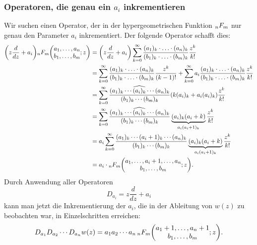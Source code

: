\subsubsection{Operatoren, die genau ein $a_i$ inkrementieren}
Wir suchen einen Operator, der in der hypergeometrischen Funktion
$\mathstrut_nF_m$ nur genau den Parameter $a_i$ inkrementiert.
Der folgende Operator schafft dies:
\begin{align*}
\biggl(z\frac{d}{dz}+a_i\biggr)
\mathstrut_nF_m\biggl(\begin{matrix}a_1,\dots,a_n\\b_1,\dots,b_m\end{matrix};
z\biggr)
&=
\biggl(z\frac{d}{dz}+a_i\biggr)
\sum_{k=0}^\infty
\frac{(a_1)_k\cdot\ldots\cdot(a_n)_k}{(b_1)_k\cdot\ldots\cdot(b_m)_k}
\frac{z^k}{k!}
\\
&=
\sum_{k=0}^\infty
\frac{(a_1)_k\cdot\ldots\cdot(a_n)_k}{(b_1)_k\cdot\ldots\cdot(b_m)_k}
\frac{z^k}{(k-1)!}
+
\sum_{k=0}^\infty
a_i
\frac{(a_1)_k\cdot\ldots\cdot(a_n)_k}{(b_1)_k\cdot\ldots\cdot(b_m)_k}
\frac{z^k}{k!}
\\
&=
\sum_{k=0}^\infty
\frac{
(a_1)_k\cdots\widehat{(a_i)_k}\cdots(a_n)_k
}{
(b_1)_k\cdots(b_m)_k
}
(
k(a_i)_k
+
a_i(a_i)_k
)
\frac{z^k}{k!}
\\
&=
\sum_{k=0}^\infty
\frac{
(a_1)_k\cdots\widehat{(a_i)_k}\cdots(a_n)_k
}{
(b_1)_k\cdots(b_m)_k
}
\underbrace{(a_i)_k(a_i+k)}_{a_i(a_i+1)_k}
\frac{z^k}{k!}
\\
&=
a_i
\sum_{k=0}^\infty
\frac{
(a_1)_k\cdots (a_i+1)_k\cdots(a_n)_k
}{
(b_1)_k\cdots(b_m)_k
}
\underbrace{(a_i)_k(a_i+k)}_{a_i(a_i+1)_k}
\frac{z^k}{k!}
\\
&=
a_i\cdot\mathstrut_nF_m\biggl(
\begin{matrix}
a_1,\dots,a_i+1,\dots,a_n\\
b_1,\dots,b_m
\end{matrix}
;z
\biggr).
\end{align*}
Durch Anwendung aller Operatoren
\[
D_{a_i} = z\frac{d}{dz}+a_i
\]
kann man jetzt die Inkrementierung der $a_i$, die in der Ableitung
von $w(z)$ zu beobachten war, in Einzelschritten erreichen:
\[
D_{a_1}D_{a_2}\cdots D_{a_n} w(z)
=
a_1a_2\cdots a_n \,
\mathstrut_nF_m\biggl(
\begin{matrix}a_1+1,\dots,a_n+1\\b_1,\dots,b_m\end{matrix}; z
\biggr).
\]

